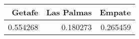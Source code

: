 \begin{tabular}{rrr}
\hline
   Getafe &   Las Palmas &   Empate \\
\hline
 0.554268 &     0.180273 & 0.265459 \\
\hline
\end{tabular}